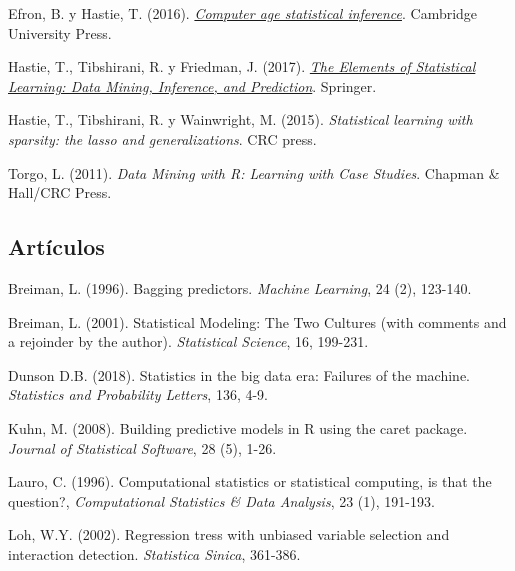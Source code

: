 \documentclass[]{book}
\theoremstyle{break}
\theoremstyle{definition}
\theoremstyle{definition}
\theoremstyle{definition}
\theoremstyle{remark}
\begin{document}
Efron, B. y Hastie, T. (2016).
\emph{\href{http://web.stanford.edu/~hastie/CASI/}{Computer age
statistical inference}}. Cambridge University Press.

Hastie, T., Tibshirani, R. y Friedman, J. (2017).
\emph{\href{https://web.stanford.edu/~hastie/ElemStatLearn}{The Elements
of Statistical Learning: Data Mining, Inference, and Prediction}}.
Springer.

Hastie, T., Tibshirani, R. y Wainwright, M. (2015). \emph{Statistical
learning with sparsity: the lasso and generalizations}. CRC press.

Torgo, L. (2011). \emph{Data Mining with R: Learning with Case Studies}.
Chapman \& Hall/CRC Press.

\subsection*{Artículos}\label{artuxedculos}

Breiman, L. (1996). Bagging predictors. \emph{Machine Learning}, 24 (2),
123-140.

Breiman, L. (2001). Statistical Modeling: The Two Cultures (with
comments and a rejoinder by the author). \emph{Statistical Science}, 16,
199-231.

Dunson D.B. (2018). Statistics in the big data era: Failures of the
machine. \emph{Statistics and Probability Letters}, 136, 4-9.

Kuhn, M. (2008). Building predictive models in R using the caret
package. \emph{Journal of Statistical Software}, 28 (5), 1-26.

Lauro, C. (1996). Computational statistics or statistical computing, is
that the question?, \emph{Computational Statistics \& Data Analysis}, 23
(1), 191-193.

Loh, W.Y. (2002). Regression tress with unbiased variable selection and
interaction detection. \emph{Statistica Sinica}, 361-386.


\end{document}
